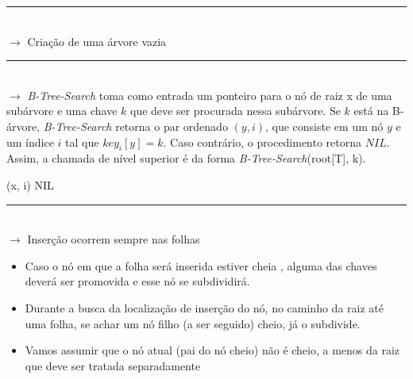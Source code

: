 \documentclass[a4paper, 12pt]{article}
\begin{document}
\rule{12cm}{0.4pt}\\

$\rightarrow$ Criação de uma árvore vazia\\

\begin{algorithmic}[1]
\end{algorithmic}

\rule{12cm}{0.4pt}\\

$\rightarrow$ \textit{B-Tree-Search} toma como entrada um ponteiro para o nó de raiz x de uma subárvore e uma chave $k$ que deve ser
procurada nessa subárvore. Se $k$ está na B-árvore, \textit{B-Tree-Search} retorna o par ordenado $(y, i)$, que consiste em um nó $y$ e um índice $i$ tal que $key_{i}[y] = k$. Caso contrário, o procedimento retorna $NIL$. Assim, a chamada de nível superior é da forma \textit{B-Tree-Search}(root[T], k).\\

\begin{algorithmic}[1]
\EndWhile
{}
	\State \Return (x, i)
	\State \Return NIL
\Else
\EndIf

\State {}
\end{algorithmic}

\rule{12cm}{0.4pt}\\

$\rightarrow$ Inserção ocorrem sempre nas folhas

\begin{itemize}
\item Caso o nó em que a folha será inserida estiver cheia , alguma das chaves deverá ser promovida e esse nó se subdividirá.
\item Durante a busca da localização de inserção do nó, no caminho da raiz até uma folha, se achar um nó filho (a ser seguido) cheio, já o subdivide.
\item Vamos assumir que o nó atual (pai do nó cheio) não é cheio, a menos da raiz que deve ser tratada separadamente
\end{itemize}
\end{document}
